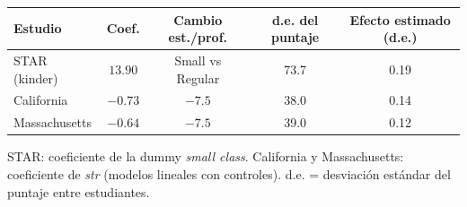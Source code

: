 
\begin{tabular}{lcccc}
\toprule
Estudio & Coef. & Cambio est./prof. & d.e. del puntaje & Efecto estimado (d.e.)\\
\midrule
STAR (kinder) & $13.90$ & Small vs Regular & 73.7 & 0.19\\
California & $-0.73$ & $-7.5$ & 38.0 & 0.14\\
Massachusetts & $-0.64$ & $-7.5$ & 39.0 & 0.12\\
\bottomrule
\end{tabular}
\par\vspace{3pt}
{\footnotesize\parbox{0.9\linewidth}{\centering STAR: coeficiente de la dummy \emph{small class}. California y Massachusetts: coeficiente de \emph{str} (modelos lineales con controles). d.e. = desviaci\'on est\'andar del puntaje entre estudiantes.}}
